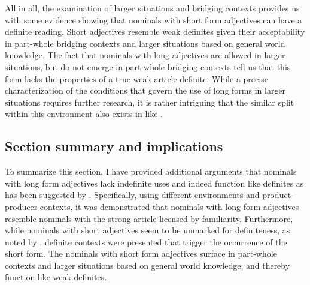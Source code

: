 \documentclass[output=paper,
modfonts
]{langscibook}
\begin{document}
All in all, the examination of larger situations and bridging contexts provides us with some evidence showing that nominals with short form adjectives can have a definite reading. Short adjectives resemble weak definites given their acceptability in part-whole bridging contexts and larger situations based on general world knowledge. The fact that nominals with long adjectives are allowed in larger situations, but do not emerge in part-whole bridging contexts tell us that this form lacks the properties of a true weak article definite. While a precise characterization of the conditions that govern the use of long forms in larger situations requires further research, it is rather intriguing that the similar split within this environment also exists in  like . 

\subsection{Section summary and implications}

To summarize this section, I have provided additional arguments that nominals with long form adjectives lack indefinite uses and indeed function like definites as has been suggested by \citet{GillonArmoskaite2015}. Specifically, using different  environments and product-producer  contexts, it was demonstrated that nominals with long form adjectives resemble  nominals with the strong article licensed by familiarity. Furthermore, while nominals with short adjectives seem to be unmarked for definiteness, as noted by \citet{Ambrazas1997}, definite contexts were presented that trigger the occurrence of the short form. The nominals with short form adjectives surface in part-whole  contexts and larger situations based on general world knowledge, and thereby function like weak definites.
 
\end{document}
